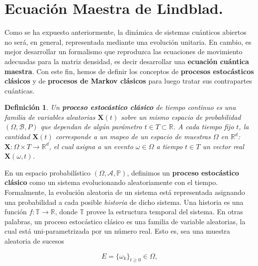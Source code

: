 \documentclass{report} %
\newtheorem{definition}{Definición}[section]
\numberwithin{equation}{section}
\begin{document}
\clearpage

\section{Ecuaci\'on Maestra de Lindblad.} 

Como se ha expuesto anteriormente, la dinámica de sistemas cuánticos abiertos no será, en general, representada mediante una evolución unitaria. En cambio, es mejor desarrollar un formalismo que reproduzca las ecuaciones de movimiento adecuadas para la matriz densidad, es decir desarrollar una \textbf{ecuación cuántica maestra}. Con este fin, hemos de definir los conceptos de
 \textbf{procesos estocásticos clásicos} y de \textbf{procesos de Markov clásicos} para luego tratar sus contrapartes cuánticas.  

\begin{Omitir}
 \begin{definition}
Un \textbf{proceso estocástico clásico} de tiempo continuo es una familia de variables aleatorias $\mathbf{X}(t)$ sobre un mismo espacio de probabilidad $(\Omega,\mathcal{B},P)$ que dependan de algún parámetro $t \in T \subset \mathbb{R}$. 
A cada tiempo fijo $t$, la cantidad $\mathbf{X}(t)$ corresponde a un mapeo de un espacio de muestras $\Omega$ en $\mathbb{R}^{d}$: $\mathbf{X} : \Omega \times T \rightarrow \mathbb{R}^{d}$, el cual asigna a un evento $\omega \in \Omega$ a tiempo $t \in T$ un vector real $\mathbf{X}(\omega,t)$.
 \end{definition}
\end{Omitir} 


En un espacio probabilístico $(\Omega, \mathcal{A}, \mathds{P})$, definimos un \textbf{proceso estocástico clásico} como un sistema evolucionando aleatoriamente con el tiempo. Formalmente, la evolución aleatoria de un sistema está representada asignando una probabilidad a cada posible \textit{historia} de dicho sistema. Una historia es una función $f : \mathds{T} \rightarrow \mathds{R}$, donde $\mathds{T}$ provee la estructura temporal del sistema. 
En otras palabras, un proceso estocástico clásico es una familia de variable aleatorias, la cual está uni-parametrizada por un número real. Esto es, sea una muestra aleatoria de sucesos

\begin{equation*}
E = \{\omega_k\}_{t\geq 0} \in \Omega,
\end{equation*}
\end{document}
